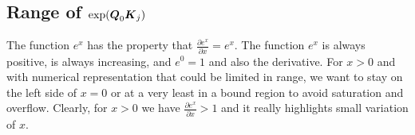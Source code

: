 \documentclass[journal]{IEEEtran}
\begin{document}
\begin{comment}
\begin{equation*}
  \Vc{r}_{0,t-1} =
  \frac{\sum_{j=0}^{t-1}(\exp{\Vc{Q}_0\Vc{K}_j})\Vc{V}_j}{\sum_{j=0}^{t-1}\exp{\Vc{Q}_0\Vc{K}_j}}
\end{equation*}
\begin{equation*}
  \Vc{r}_{t,n} = \frac{\sum_{j=t}^{n}(\exp{\Vc{Q}_0\Vc{K}_j})\Vc{V}_j}{\sum_{j=t}^n\exp{\Vc{Q}_0\Vc{K}_j}}
\end{equation*}

\begin{equation}
  \Vc{D}_{\iota,\ell} = \sum_{j=\iota}^{\ell}\exp{\Vc{Q}_0\Vc{K}_j}
\end{equation}
\begin{equation}
  \Vc{D}_{0,n} = \Vc{D}_{0,t-1} + \Vc{D}_{t,n}
\end{equation}

\begin{equation*}
  \Vc{R}_0 = \frac{\Vc{D}_{0,t-1}}{\Vc{D}_{0,t-1} + \Vc{D}_{t,n}}\Vc{r}_{0,t-1}  +  \frac{\Vc{D}_{t,n}}{\Vc{D}_{0,t-1} + \Vc{D}_{t,n}}\Vc{r}_{t,n} 
\end{equation*}
The fraction is actually a scalar operation: it is an element wise
scalar to be multiplied to $\Vc{r}_{0,i}$

\begin{equation*}
  \Vc{r}_{0,t+1} = \frac{\Vc{D}_{0,t-1}}{\Vc{D}_{0,t-1} + \Vc{D}_{t,t+1}}\Vc{r}_{0,t-1}  +  \frac{\Vc{D}_{t,t+1}}{\Vc{D}_{0,t-1} + \Vc{D}_{t,t+1}}\Vc{r}_{t,t+1} 
\end{equation*}

The Divion does not need to be done step by step but only at the
end. So we have a matrix update iteration as in Equation \ref{eq:sum0}
and \ref{eq:sum1}, and we can conclude with the final result in
Equation \ref{eq:res} and \ref{eq:resall}.
\end{comment}



\subsection{Range of $\exp({\boldsymbol Q}_0{\boldsymbol K}_j)$}
\label{sec:range}
The function $e^x$ has the property that $\frac{\partial e^x}{\partial
  x}= e^x$. The function $e^x$ is always positive, is always
increasing, and $e^0=1$ and also the derivative. For $x>0$ and with
numerical representation that could be limited in range, we want to
stay on the left side of $x=0$ or at a very least in a bound region to
avoid saturation and overflow. Clearly, for $x>0$ we have
$\frac{\partial e^x}{\partial x}>1$ and it really highlights small
variation of $x$.
\end{document}
